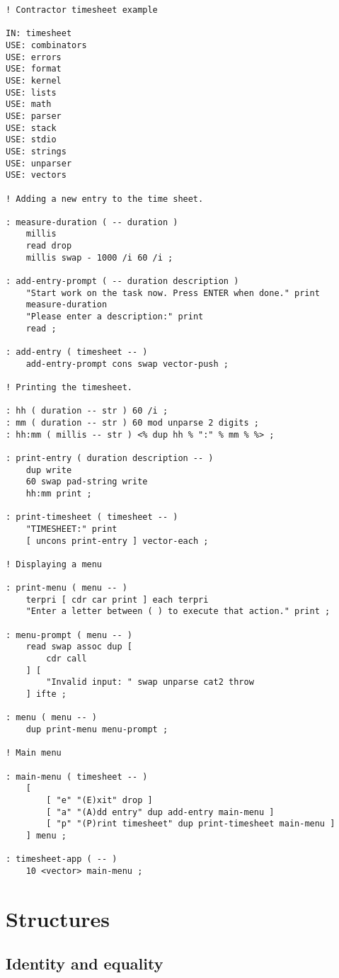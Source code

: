 \documentclass[english]{article}
\begin{document}
\begin{verbatim}
! Contractor timesheet example

IN: timesheet
USE: combinators
USE: errors
USE: format
USE: kernel
USE: lists
USE: math
USE: parser
USE: stack
USE: stdio
USE: strings
USE: unparser
USE: vectors

! Adding a new entry to the time sheet.

: measure-duration ( -- duration )
    millis
    read drop
    millis swap - 1000 /i 60 /i ;

: add-entry-prompt ( -- duration description )
    "Start work on the task now. Press ENTER when done." print
    measure-duration
    "Please enter a description:" print
    read ;

: add-entry ( timesheet -- )
    add-entry-prompt cons swap vector-push ;

! Printing the timesheet.

: hh ( duration -- str ) 60 /i ;
: mm ( duration -- str ) 60 mod unparse 2 digits ;
: hh:mm ( millis -- str ) <% dup hh % ":" % mm % %> ;

: print-entry ( duration description -- )
    dup write
    60 swap pad-string write
    hh:mm print ;

: print-timesheet ( timesheet -- )
    "TIMESHEET:" print
    [ uncons print-entry ] vector-each ;

! Displaying a menu

: print-menu ( menu -- )
    terpri [ cdr car print ] each terpri
    "Enter a letter between ( ) to execute that action." print ;

: menu-prompt ( menu -- )
    read swap assoc dup [
        cdr call
    ] [
        "Invalid input: " swap unparse cat2 throw
    ] ifte ;

: menu ( menu -- )
    dup print-menu menu-prompt ;

! Main menu

: main-menu ( timesheet -- )
    [
        [ "e" "(E)xit" drop ]
        [ "a" "(A)dd entry" dup add-entry main-menu ]
        [ "p" "(P)rint timesheet" dup print-timesheet main-menu ]
    ] menu ;

: timesheet-app ( -- )
    10 <vector> main-menu ;
\end{verbatim}

\section{Structures}

\subsection{Identity and equality}
\end{document}
